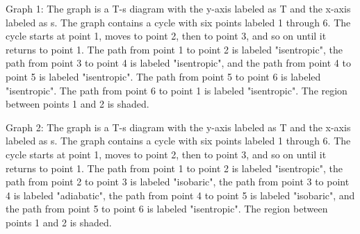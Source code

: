 Graph 1: The graph is a T-s diagram with the y-axis labeled as T and the x-axis labeled as s. The graph contains a cycle with six points labeled 1 through 6. The cycle starts at point 1, moves to point 2, then to point 3, and so on until it returns to point 1. The path from point 1 to point 2 is labeled "isentropic", the path from point 3 to point 4 is labeled "isentropic", and the path from point 4 to point 5 is labeled "isentropic". The path from point 5 to point 6 is labeled "isentropic". The path from point 6 to point 1 is labeled "isentropic". The region between points 1 and 2 is shaded.

Graph 2: The graph is a T-s diagram with the y-axis labeled as T and the x-axis labeled as s. The graph contains a cycle with six points labeled 1 through 6. The cycle starts at point 1, moves to point 2, then to point 3, and so on until it returns to point 1. The path from point 1 to point 2 is labeled "isentropic", the path from point 2 to point 3 is labeled "isobaric", the path from point 3 to point 4 is labeled "adiabatic", the path from point 4 to point 5 is labeled "isobaric", and the path from point 5 to point 6 is labeled "isentropic". The region between points 1 and 2 is shaded.